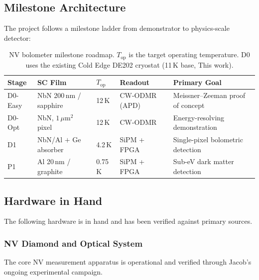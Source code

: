 \subsection{Milestone Architecture}
\label{sec:milestone_arch}

The project follows a milestone ladder from demonstrator to physics-scale detector:

\begin{table}[ht]
\centering
\caption{NV bolometer milestone roadmap. $T_\mathrm{op}$ is the target operating
  temperature. D0 uses the existing Cold Edge DE202 cryostat (11\,K base, This work).}
\label{tab:milestones}
\small
\begin{tabular}{@{}p{1.5cm}p{2.8cm}p{1.8cm}p{2.8cm}p{4.2cm}@{}}
\toprule
Stage & SC Film & $T_\mathrm{op}$ & Readout & Primary Goal \\
\midrule
D0-Easy & NbN 200\,nm / sapphire & 12\,K & CW-ODMR (APD) & Meissner--Zeeman proof of concept \\
D0-Opt  & NbN, $1\,\mu\text{m}^2$ pixel & 12\,K & CW-ODMR & Energy-resolving demonstration \\
D1      & NbN/Al $+$ Ge absorber & 4.2\,K & SiPM + FPGA & Single-pixel bolometric detection \\
P1      & Al 20\,nm / graphite & 0.75\,K & SiPM + FPGA & Sub-eV dark matter detection \\
\bottomrule
\end{tabular}
\end{table}

\subsection{Hardware in Hand}
\label{sec:existing_hw}

The following hardware is in hand and has been verified against primary sources.

\subsubsection{NV Diamond and Optical System}

The core NV measurement apparatus is operational and verified through Jacob's ongoing
experimental campaign.

